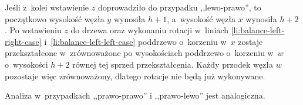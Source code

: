 Jeśli z~kolei wstawienie $z$ doprowadziło do przypadku ,,lewo-prawo'', to początkowo wysokość węzła $y$ wynosiła $h+1$, a~wysokość węzła $x$ wynosiła $h+2$.
Po wstawieniu $z$ do drzewa oraz wykonaniu rotacji w~liniach \ref{li:balance-left-right-case} i~\ref{li:balance-left-left-case} poddrzewo o~korzeniu w~$x$ zostaje przekształcone w~zrównoważone po wysokościach poddrzewo o~korzeniu w~$w$ o~wysokości $h+2$ równej tej sprzed przekształcenia.
Każdy przodek węzła $w$ pozostaje więc zrównoważony, dlatego rotacje nie będą już wykonywane.

Analiza w~przypadkach ,,prawo-prawo'' i ,,prawo-lewo'' jest analogiczna.
